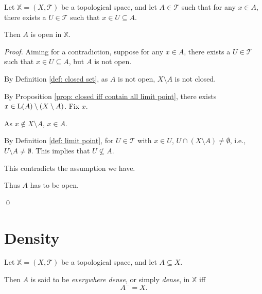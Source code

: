 \begin{proposition}
	\label{prop: point in open set (only if)}
	Let $\mathbb X = (X, \mathcal T)$ be a topological space, and let $A \in \mathcal T$ such that for any $x \in A$, there exists a $U \in \mathcal T$ such that $x \in U \subseteq A$.
	
	Then $A$ is open in $\mathbb X$.

	\begin{proof}
		Aiming for a contradiction, suppose for any $x \in A$, there exists a $U \in \mathcal T$ such that $x \in U \subseteq A$, but $A$ is not open.
		
		By Definition \ref{def: closed set}, as $A$ is not open, $X \setminus A$ is not closed.
		
		By Proposition \ref{prop: closed iff contain all limit point}, there exists $x \in \mathrm{L}(A) \setminus (X \setminus A)$. Fix $x$.
		
		As $x \notin X \setminus A$, $x \in A$.
		
		By Definition \ref{def: limit point}, for $U \in \mathcal T$ with $x \in U$, $U \cap (X \setminus A) \ne \emptyset$, i.e., $U \setminus A \ne \emptyset$. This implies that $U \not \subseteq A$.
		
		This contradicts the assumption we have.
		
		Thus $A$ has to be open.
		
		\qed
	\end{proof}
\end{proposition}


\section{Density}


\begin{definition}
	\label{def: dense}
	Let $\mathbb X = (X, \mathcal T)$ be a topological space, and let $A \subseteq X$.
	
	Then $A$ is said to be \textit{everywhere dense}, or simply \textit{dense}, in $\mathbb X$ iff
	$$
	A^- = X.
	$$
\end{definition}


